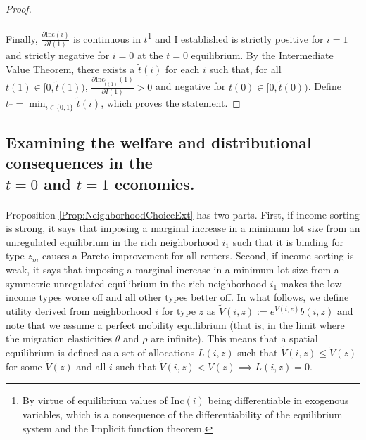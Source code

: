 \documentclass[12pt]{article}
\begin{document}
\begin{enumerate}
\begin{proof}
			\paragraph*{}
			Finally,  $\frac{\partial \text{Inc}(i)}{\partial I(1)}$ is continuous in $t$\footnote{By virtue of equilibrium values of $\text{Inc}(i)$ being differentiable in exogenous variables, which is a consequence of the differentiability of the equilibrium system and the Implicit function theorem.} and I established is strictly positive for $i = 1$ and strictly negative for $i = 0$ at the $t = 0$ equilibrium. By the Intermediate Value Theorem, there exists a $\tilde{t}(i)$ for each $i$ such that, for all $t(1) \in [0, \tilde{t}(1))$, $\frac{\partial \text{Inc}_{\tilde{t}(1)}(1)}{\partial I(1)} > 0$ and negative for $t(0) \in [0, \tilde{t}(0))$. Define $t^{\downarrow} = \min_{i \in \{0, 1\}}\tilde{t}(i)$, which proves the statement. 
		\end{proof}
		
	\end{enumerate}
	
	 
	\clearpage
	\subsection{Examining the welfare and distributional consequences in the \\ $t = 0$ and $t = 1$ economies.}\label{Proof:WelfareDistConsequences}
	\paragraph*{}
	Proposition \ref{Prop:NeighborhoodChoiceExt} has two parts. First, if income sorting is strong, it says that imposing a marginal increase in a minimum lot size from an unregulated equilibrium in the rich neighborhood $i_{1}$ such that it is binding for type $z_{m}$ causes a Pareto improvement for all renters. Second, if income sorting is weak, it says that imposing a marginal increase in a minimum lot size from a symmetric unregulated equilibrium in the rich neighborhood $i_{1}$ makes the low income types worse off and all other types better off. In what follows, we define utility derived from neighborhood $i$ for type $z$ as $\tilde{V}(i, z) := e^{V(i, z)}b(i, z)$ and note that we assume a perfect mobility equilibrium (that is, in the limit where the migration elasticities $\theta$ and $\rho$ are infinite). This means that a spatial equilibrium is defined as a set of allocations $L(i, z)$ such that $\tilde{V}(i, z) \leq \tilde{V}(z)$ for some $\tilde{V}(z)$ and all $i$ such that $\tilde{V}(i, z) < \tilde{V}(z) \implies L(i, z) = 0$. 
	
\end{document}
